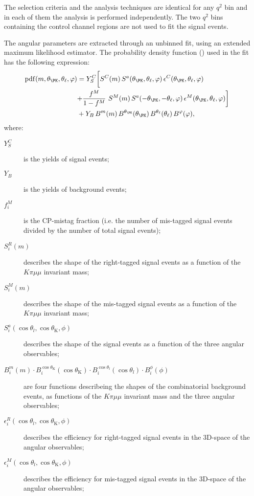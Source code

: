 The selection criteria and the analysis techniques are identical for any $q^2$ bin and in each of them the analysis is performed independently.
The two $q^2$ bins containing the control channel regions are not used to fit the signal events.

The angular parameters are extracted through an unbinned fit, using an extended maximum likelihood estimator.
The probability density function (\pdf) used in the fit has the following expression:
\begin{equation} \label{eq:angALL}
  \begin{split}
    \mathrm{pdf}(m,\theta_\PK,\theta_\ell,\varphi) & = Y^{C}_{S} \biggl[ S^{C}(m)  \, S^a(\theta_\PK,\theta_\ell,\varphi) \, \epsilon^{C}(\theta_\PK,\theta_\ell,\varphi) \biggr. \\
      & \biggl. + \frac{f^{M}}{1-f^{M}}~S^{M}(m) \, S^a(-\theta_\PK,-\theta_\ell,\varphi) \, \epsilon^{M}(\theta_\PK,\theta_\ell,\varphi) \biggr] \\
    & + Y_{B}\,B^m(m) \, B^{\theta_\PK}(\theta_\PK) \, B^{\theta_\ell}(\theta_\ell) \, B^{\varphi}(\varphi), \\
  \end{split}
\end{equation}
where:
\begin{description}
    \item[$Y_{S}^C$] is the yields of signal events;
    \item[$Y_{B}$] is the yields of background events;
    \item[$f_i^M$] is the CP-mistag fraction (i.e. the number of mis-tagged signal events divided by the number of total signal events);
    \item[$S_i^R(m)$] describes the shape of the right-tagged signal events as a function of the $K\pi\mu\mu$ invariant mass;
    \item[$S_i^M(m)$] describes the shape of the mis-tagged signal events as a function of the $K\pi\mu\mu$ invariant mass;
    \item[$S_i^a(\cos\theta_l,\cos\theta_\mathrm{K},\phi)$] describes the shape of the signal events as a function of the three angular observables;
    \item[$B_i^m(m) \cdot B_i^{\cos\theta_\mathrm{K}}(\cos\theta_\mathrm{K}) \cdot B_i^{\cos\theta_l}(\cos\theta_l) \cdot B_i^{\phi}(\phi) $] are four functions describeing the shapes of the combinatorial background events, as functions of the $K\pi\mu\mu$ invariant mass and the three angular observables; 
    \item[$\epsilon_i^R(\cos\theta_l,\cos\theta_\mathrm{K},\phi)$] describes the efficiency for right-tagged signal events in the 3D-space of the angular observables;
    \item[$\epsilon_i^M(\cos\theta_l,\cos\theta_\mathrm{K},\phi)$] describes the efficiency for mis-tagged signal events in the 3D-space of the angular observables;
\end{description}

